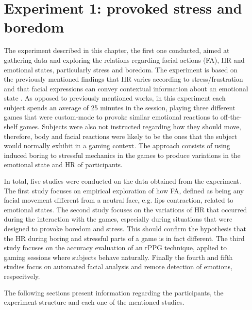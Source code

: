 \chapter{Experiment 1: provoked stress and boredom}
\label{ch:experiment1}

The experiment described in this chapter, the first one conducted, aimed at gathering data and exploring the relations regarding facial actions (FA), HR and emotional states, particularly stress and boredom. The experiment is based on the previously mentioned findings that HR varies according to stress/frustration and that facial expressions can convey contextual information about an emotional state \parencite{giannakakis2017stress}. As opposed to previously mentioned works, in this experiment each subject spends an average of 25 minutes in the session, playing three different games that were custom-made to provoke similar emotional reactions to off-the-shelf games. Subjects were also not instructed regarding how they should move, therefore, body and facial reactions were likely to be the ones that the subject would normally exhibit in a gaming context. The approach consists of using induced boring to stressful mechanics in the games to produce variations in the emotional state and HR of participants. %

In total, five studies were conducted on the data obtained from the experiment. The first study focuses on empirical exploration of how FA, defined as being any facial movement different from a neutral face, e.g. lips contraction, related to emotional states. The second study focuses on the variations of HR that occurred during the interaction with the games, especially during situations that were designed to provoke boredom and stress. This should confirm the hypothesis that the HR during boring and stressful parts of a game is in fact different. The third study focuses on the accuracy evaluation of an rPPG technique, applied to gaming sessions where subjects behave naturally. Finally the fourth and fifth studies focus on automated facial analysis and remote detection of emotions, respecitvely.

The following sections present information regarding the participants, the experiment structure and each one of the mentioned studies.


